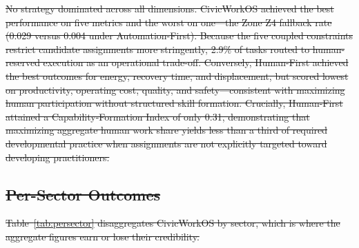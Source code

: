 \documentclass[utf8]{FrontiersinHarvard}
\providecommand{\DIFdel}[1]{{\protect\color{red}\sout{#1}}}                      %
\begin{document}
\DIFdel{No strategy dominated across all dimensions. CivicWorkOS achieved the best performance on five metrics and the worst on one---the Zone Z4 fallback rate (0.029 versus 0.004 under Automation-First). Because the five coupled constraints restrict candidate assignments more stringently, 2.9\% of tasks routed to human-reserved execution as an operational trade-off. Conversely, Human-First achieved the best outcomes for energy, recovery time, and displacement, but scored lowest on productivity, operating cost, quality, and safety---consistent with maximizing human participation without structured skill formation. Crucially, Human-First attained a Capability-Formation Index of only 0.31, demonstrating that maximizing aggregate human work share yields less than a third of required developmental practice when assignments are not explicitly targeted toward developing practitioners.
	}%


\subsection{\DIFdel{Per-Sector Outcomes}}
\addtocounter{subsection}{-1}%

\DIFdel{Table~\ref{tab:persector} disaggregates CivicWorkOS by sector, which is where the aggregate figures earn or lose their credibility.
	}%
\end{document}
